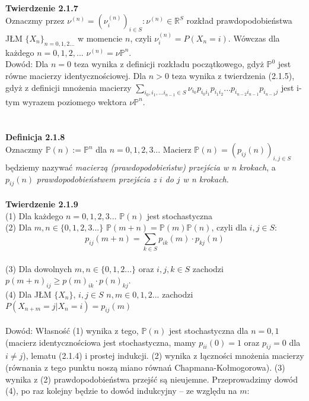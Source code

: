 \documentclass[a4paper]{article}
\begin{document}
\qedsymbol
\\\\\\
\textbf{Twierdzenie 2.1.7}\\
Oznaczmy przez $\nu^{(n)} = (\nu_i^{(n)})_{i \in S}: \nu^{(n)} \in \mathbb{R}^S$ rozkład prawdopodobieństwa JŁM $\{X_n\}_{n = 0,1,2...}$ w momencie $n$, czyli $\nu^{(n)}_i = P(X_n = i)$. Wówczas dla każdego $n= 0,1,2,...$ $\nu^{(n)} = \nu \mathbb{P}^n$.\\
Dowód: Dla $n=0$ teza wynika z definicji rozkładu początkowego, gdyż $\mathbb{P}^0$ jest równe macierzy identycznościowej. Dla $n>0$ teza wynika z twierdzenia (2.1.5), gdyż z definicji mnożenia macierzy $\sum\limits_{i_0, i_1,... i_{n-1} \in S} \nu_{i_0} p_{i_{0}i_{1}} p_{i_{1}i_{2}} ... p_{i_{n-2}i_{n-1}}p_{i_{n-1}j}$ jest i-tym wyrazem poziomego wektora $\nu \mathbb{P}^n$.
\\\\\\
\textbf{Definicja 2.1.8}\\
Oznaczmy $\mathbb{P}(n) := \mathbb{P}^n$ dla $n=0,1,2,3..$. Macierz $\mathbb{P}(n) = (p_{ij}(n))_{i, j \in S}$ będziemy nazywać \textit{macierzą (prawdopodobieństw) przejścia w n krokach}, a $p_{ij}(n)$ \textit{prawdopodobieństwem przejścia z $i$ do $j$ w n krokach}.
\\\\
\textbf{Twierdzenie 2.1.9}
\\(1) Dla każdego $n=0,1,2,3...$ $\mathbb{P}(n)$ jest stochastyczna
\\(2) Dla $m,n \in \{0,1,2,3...\}$ $\mathbb{P}(m+n) = \mathbb{P}(m)\mathbb{P}(n)$, czyli dla $i,j \in S$: $$p_{ij}(m+n) = \sum\limits_{k \in S} p_{ik}(m) \cdot p_{kj}(n)$$
\\(3) Dla dowolnych $m,n \in \{0,1,2...\}$ oraz $i,j,k \in S$ zachodzi $p(m+n)_{ij} \geq p(m)_{ik}\cdot p(n)_{kj}$.
\\(4) Dla JŁM $\{X_n\}$, $i,j \in S$ $n,m \in {0,1,2...}$ zachodzi $P(X_{n+m} = j|X_n = i) = p_{ij}(m)$
\\\\
Dowód: Własność (1) wynika z tego, $\mathbb{P}(n)$ jest stochastyczna dla $n= 0,1$ (macierz identycznościowa jest stochastyczna, mamy $p_{ii}(0) = 1$ oraz $p_{ij} = 0$ dla $i\neq j$), lematu (2.1.4) i prostej indukcji. (2) wynika z łączności mnożenia macierzy (równania z tego punktu noszą miano równań Chapmana-Kołmogorowa). (3) wynika z (2) prawdopodobieństwa przejść są nieujemne. Przeprowadzimy dowód (4), po raz kolejny będzie to dowód indukcyjny – ze względu na $m$:
\end{document}
